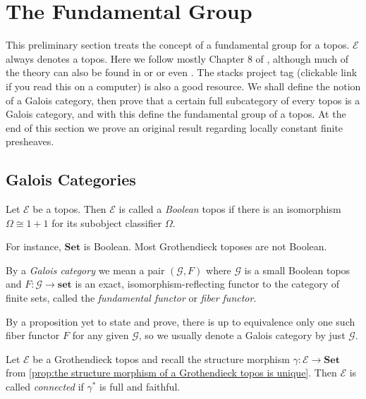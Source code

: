 %
%

\chapter{The Fundamental Group}
This preliminary section treats the concept of a fundamental group for a topos. $\mathscr{E}$ always denotes a topos. Here we follow mostly Chapter 8 of \cite{johnstone77}, although much of the theory can also be found in \cite[Exposé V, Sections 4, 5, and 6]{SGA1} or \cite[Chapter 3]{lenstra08} or even \cite{szamuely}. The stacks project tag \cite[\href{http://stacks.math.columbia.edu/tag/0BMQ}{0BMQ}]{stacks-project} (clickable link if you read this on a computer) is also a good resource. We shall define the notion of a Galois category, then prove that a certain full subcategory of every topos is a Galois category, and with this define the fundamental group of a topos. At the end of this section we prove an original result regarding locally constant finite presheaves.

\section{Galois Categories}

\begin{definition}
Let $\mathscr{E}$ be a topos. Then $\mathscr{E}$ is called a \emph{Boolean} topos  if there is an isomorphism $\Omega \cong 1 + 1$ for its subobject classifier $\Omega$.
\end{definition}

For instance, $\mathbf{Set}$ is Boolean. Most Grothendieck toposes are not Boolean.

\begin{definition}
\label{def:galois category}
By a \emph{Galois category}    we mean a pair $(\mathscr{G},F)$ where $\mathscr{G}$ is a small Boolean topos and $F : \mathscr{G} \to \mathbf{set}$ is an exact, isomorphism-reflecting functor to the category of finite sets, called the \emph{fundamental functor} or \emph{fiber functor}.
\end{definition}
By a proposition yet to state and prove, there is up to equivalence only one such fiber functor $F$ for any given $\mathscr{G}$, so we usually denote a Galois category by just $\mathscr{G}$.

\begin{definition}
\label{def:connected topos}
Let $\mathscr{E}$ be a Grothendieck topos and recall the structure morphism $\gamma : \mathscr{E} \to \mathbf{Set}$ from \cref{prop:the structure morphism of a Grothendieck topos is unique}. Then $\mathscr{E}$ is called \emph{connected}  if $\gamma^*$ is full and faithful.  
\end{definition}

